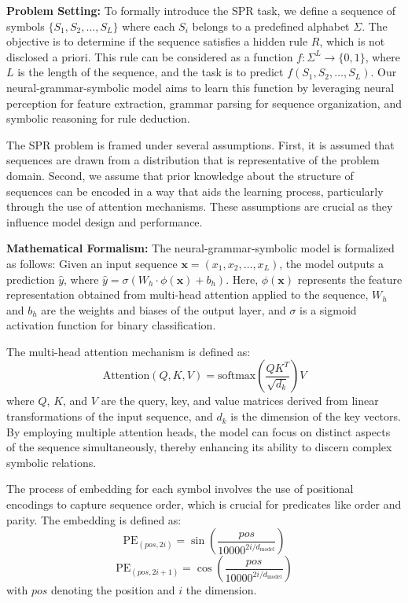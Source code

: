 \documentclass{article}
\begin{document}
\textbf{Problem Setting:} To formally introduce the SPR task, we define a sequence of symbols $\{S_1, S_2, \ldots, S_L\}$ where each $S_i$ belongs to a predefined alphabet $\Sigma$. The objective is to determine if the sequence satisfies a hidden rule $R$, which is not disclosed a priori. This rule can be considered as a function $f: \Sigma^L \rightarrow \{0, 1\}$, where $L$ is the length of the sequence, and the task is to predict $f(S_1, S_2, \ldots, S_L)$. Our neural-grammar-symbolic model aims to learn this function by leveraging neural perception for feature extraction, grammar parsing for sequence organization, and symbolic reasoning for rule deduction.

The SPR problem is framed under several assumptions. First, it is assumed that sequences are drawn from a distribution that is representative of the problem domain. Second, we assume that prior knowledge about the structure of sequences can be encoded in a way that aids the learning process, particularly through the use of attention mechanisms. These assumptions are crucial as they influence model design and performance.

\textbf{Mathematical Formalism:} The neural-grammar-symbolic model is formalized as follows: Given an input sequence $\mathbf{x} = (x_1, x_2, \ldots, x_L)$, the model outputs a prediction $\hat{y}$, where $\hat{y} = \sigma(W_h \cdot \phi(\mathbf{x}) + b_h)$. Here, $\phi(\mathbf{x})$ represents the feature representation obtained from multi-head attention applied to the sequence, $W_h$ and $b_h$ are the weights and biases of the output layer, and $\sigma$ is a sigmoid activation function for binary classification.

The multi-head attention mechanism is defined as:
\[
\text{Attention}(Q, K, V) = \text{softmax}\left(\frac{QK^T}{\sqrt{d_k}}\right)V
\]
where $Q$, $K$, and $V$ are the query, key, and value matrices derived from linear transformations of the input sequence, and $d_k$ is the dimension of the key vectors. By employing multiple attention heads, the model can focus on distinct aspects of the sequence simultaneously, thereby enhancing its ability to discern complex symbolic relations.

The process of embedding for each symbol involves the use of positional encodings to capture sequence order, which is crucial for predicates like order and parity. The embedding is defined as:
\[
\text{PE}_{(pos, 2i)} = \sin\left(\frac{pos}{10000^{2i/d_{\text{model}}}}\right)
\]
\[
\text{PE}_{(pos, 2i+1)} = \cos\left(\frac{pos}{10000^{2i/d_{\text{model}}}}\right)
\]
with $pos$ denoting the position and $i$ the dimension.
\end{document}
